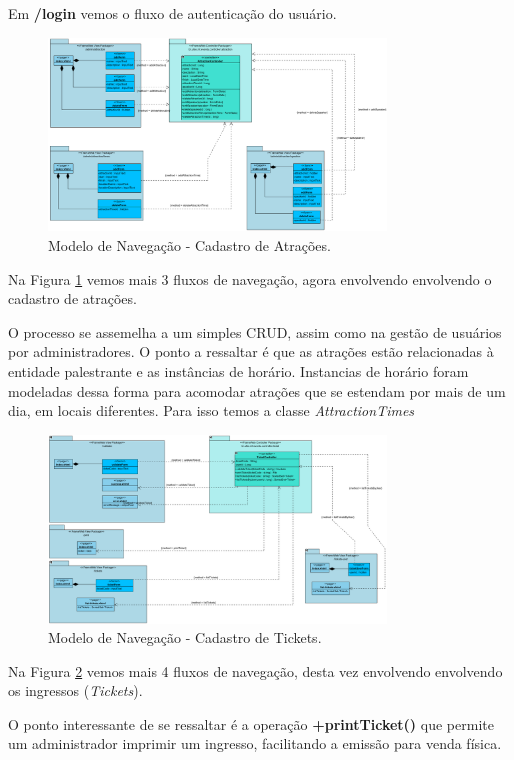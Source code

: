 Em \textbf{/login} vemos o fluxo de autenticação do usuário.

\begin{figure}[h]
	\centering
	\includegraphics[width=0.8\textwidth]{figuras/ModeloNavegacaoAttr.PNG}
	\caption{Modelo de Navegação - Cadastro de Atrações.}
	\label{figura-cadastroattr}
\end{figure}


Na Figura \ref{figura-cadastroattr} vemos mais 3 fluxos de navegação, agora envolvendo envolvendo o cadastro de atrações.

O processo se assemelha a um simples CRUD, assim como na gestão de usuários por administradores. O ponto a ressaltar é que as atrações estão relacionadas à entidade palestrante e as instâncias de horário. Instancias de horário foram modeladas dessa forma para acomodar atrações que se estendam por mais de um dia, em locais diferentes. Para isso temos a classe \textit{AttractionTimes}
 
\begin{figure}[h]
	\centering
	\includegraphics[width=0.8\textwidth]{figuras/ModeloNavegacaoTicket.PNG}
	\caption{Modelo de Navegação - Cadastro de Tickets.}
	\label{figura-cadastrotickets}
\end{figure}

Na Figura \ref{figura-cadastrotickets} vemos mais 4 fluxos de navegação, desta vez envolvendo envolvendo os ingressos (\textit{Tickets}).

O ponto interessante de se ressaltar é a operação \textbf{+printTicket()} que permite um administrador imprimir um ingresso, facilitando a emissão para venda física.